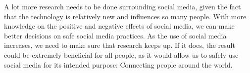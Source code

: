 \documentclass[12pt, journal, compsoc]{IEEEtran}
\begin{document}
A lot more research needs to be done surrounding social media, given the fact that the technology is relatively new and influences so many people. With more knowledge on the positive and negative effects of social media, we can make better decisions on safe social media practices. As the use of social media increases, we need to make sure that research keeps up. If it does, the result could be extremely beneficial for all people, as it would allow us to safely use social media for its intended purpose: Connecting people around the world.



\end{document}
